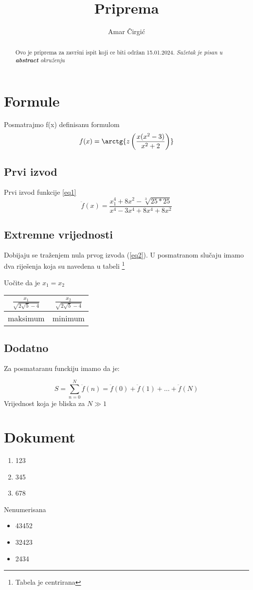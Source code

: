 \documentclass[twocolumn, 12pt, a4paper]{article}
\begin{document}
\title{Priprema}
\author{Amar Čirgić}
\maketitle
\begin{abstract}
Ovo je priprema za završni ispit koji ce biti održan 15.01.2024.  \textit{Sažetak je pisan u \textbf{abstract} okruženju} 
\end{abstract}
\section{Formule}
Posmatrajmo f(x) definisanu formulom
\begin{equation}\label{eq1}
	f(x)=\arctg{z\left( \frac{x(x^2-3)}{x^2+2}\right)}
\end{equation}
\subsection{Prvi izvod}
Prvi izvod funkcije \ref{eq1}
\begin{equation}\label{eq2}
	\ddot{f}(x)=\frac{x^4_1 + 8x^2-\sqrt[3]{25*25}}{x^4 - 3x^4 + 8x^4 + 8x^2}
\end{equation}
\subsection{Extremne vrijednosti}
Dobijaju se traženjem nula prvog izvoda  (\ref{eq2}). U posmatranom slučaju imamo dva riješenja koja su navedena u tabeli \footnote{Tabela je centrirana}

Uočite da je $ x_1=x_2 $
\newpage
\begin{table}[t]
	\centering
\begin{tabular} {cc}
	\hline
	$ \frac{x_1}{\sqrt{2\sqrt{5}-4}}$ & $\frac{x_2}{\sqrt{2\sqrt{5}-4}} $ \\ \hline
	maksimum & minimum \\
	\hline
\end{tabular}
\end{table}

\subsection{Dodatno}
Za posmataranu funckiju imamo da je: 


$$S=\sum_{n=0}^{N}{\ddot{f}(n) = \ddot{f}(0) + \ddot{f}(1) + \ldots + \ddot{f}(N)}$$ 
Vrijednost koja je bliska za $N \gg 1 $
\section{Dokument}
\begin{enumerate}
	\item 123
	\item 345
	\item 678
\end{enumerate}
Nenumerisana
\begin{itemize}
	\item 43452
	\item 32423
	\item 2434
\end{itemize}
\end{document}
